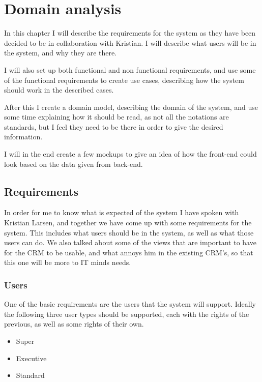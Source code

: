 \chapter{Domain analysis}
\label{chap:Domain analysis}
In this chapter I will describe the requirements for the system as they have
been decided to be in collaboration with Kristian. I will describe what users
will be in the system, and why they are there. 

I will also set up both functional and non functional requirements, and use some
of the functional requirements to create use cases, describing how the system
should work in the described cases. 

After this I create a domain model, describing the domain of the system, and use
some time explaining how it should be read, as not all the notations are
standards, but I feel they need to be there in order to give the desired
information. 

I will in the end create a few mockups to give an idea of how the front-end
could look based on the data given from back-end. 

\section{Requirements}
\label{sec:Requirements}
In order for me to know what is expected of the system I have spoken with
Kristian Larsen, and together we have come up with some requirements for the
system. This includes what users should be in the system, as well as what those
users can do. We also talked about some of the views that are important to have
for the CRM to be usable, and what annoys him in the existing CRM's, so that
this one will be more to IT minds needs. 

\subsection{Users}
\label{sub:Users}

One of the basic requirements are the users that the system will support.
Ideally the following three user types should be supported, each with the rights
of the previous, as well as some rights of their own. 

\begin{itemize}
  \item Super
  \item Executive
  \item Standard
\end{itemize}

